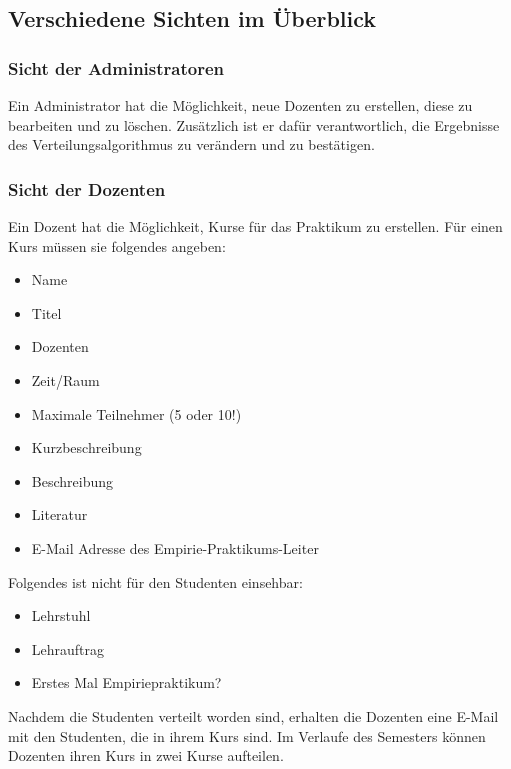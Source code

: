     \subsection{Verschiedene Sichten im Überblick}
    \label{Sichten}
                
        \subsubsection{Sicht der Administratoren}
        Ein Administrator hat die Möglichkeit, neue Dozenten zu erstellen, diese zu bearbeiten und zu löschen.
        Zusätzlich ist er dafür verantwortlich, die Ergebnisse des Verteilungsalgorithmus zu verändern und zu bestätigen.
             
            
        \subsubsection{Sicht der Dozenten}
        Ein Dozent hat die Möglichkeit, Kurse für das Praktikum zu erstellen. Für einen Kurs müssen sie folgendes angeben:
        \begin{itemize}
        \item Name
        \item Titel
        \item Dozenten
        \item Zeit/Raum
        \item Maximale Teilnehmer (5 oder 10!)
        \item Kurzbeschreibung
        \item Beschreibung
        \item Literatur
        \item E-Mail Adresse des Empirie-Praktikums-Leiter %
        \end{itemize}
        Folgendes ist nicht für den Studenten einsehbar:
        \begin{itemize}
        \item Lehrstuhl
        \item Lehrauftrag
        \item Erstes Mal Empiriepraktikum?
        \end{itemize}
        
        Nachdem die Studenten verteilt worden sind, erhalten die Dozenten eine E-Mail mit den Studenten, die in ihrem Kurs sind.
        Im Verlaufe des Semesters können Dozenten ihren Kurs in zwei Kurse aufteilen.
        
